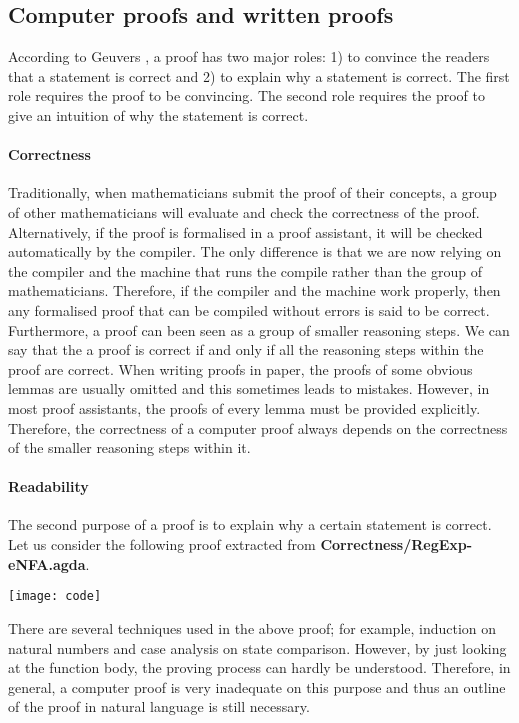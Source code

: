 \subsection{Computer proofs and written proofs}
\par According to Geuvers \cite{geuvers2009}, a proof has two major roles: 1)
to convince the readers that a statement is correct and 2) to explain
why a statement is correct. The first role requires the proof to be
convincing. The second role requires the proof to give an
intuition of why the statement is correct. 

\paragraph{Correctness} Traditionally, when mathematicians submit
the proof of their concepts, a group of other mathematicians will
evaluate and check the correctness of the proof. Alternatively, if the
proof is formalised in a proof assistant, it will be checked 
automatically by the compiler. The only difference is that we are now
relying on the compiler and the machine that runs the compile rather
than the group of mathematicians. Therefore, if the compiler and the
machine work properly, then any formalised proof that
can be compiled without errors is said to be correct. Furthermore, a
proof can been seen as a group of smaller reasoning steps. We can say that the a proof is correct if and only if all the
reasoning steps within the proof are correct. When writing proofs in paper, the proofs of
some obvious lemmas are usually omitted and this sometimes leads to mistakes. However, in
most proof assistants, the proofs of every lemma must be provided explicitly. Therefore, the correctness of
a computer proof always depends on the correctness of the smaller reasoning steps within it. 

\paragraph{Readability} The second purpose of a proof is to explain why
a certain statement is correct. Let us consider the following proof extracted from \textbf{Correctness/RegExp-eNFA.agda}. 
\begin{center} \texttt{[image: code]} \end{center}

\par There are several techniques used in the above proof; for example,
induction on natural numbers and case analysis on state comparison. However, by
just looking at the function body, the proving process can hardly be
understood. Therefore, in general, a computer proof is very inadequate on
this purpose and thus an outline of the proof in natural language is
still necessary. 

